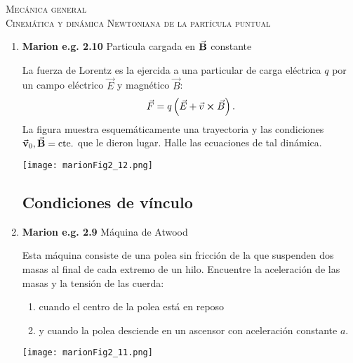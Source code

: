 \documentclass[11pt,spanish,a4paper]{article}
\begin{document}
\begin{center}
  \textsc{\large Mecánica general}\\
  \textsc{\large Cinemática y dinámica Newtoniana de la partícula puntual}
\end{center}

\begin{enumerate}


\subsection*{Ecuaciones de la dinámica - 2"a ley de Netwon}
\item
\begin{minipage}[t][6.5cm]{0.6\textwidth}
\textbf{Marion e.g. 2.10} Particula cargada en \(\va{B}\) constante

La fuerza de Lorentz es la ejercida a una particular de carga eléctrica \(q\) por un campo eléctrico \(\vec{E}\) y magnético \(\vec{B}\):
\[
	\vec{F}= q \left( \vec{E}+ \vec{v} \cross \vec{B} \right).
\]
La figura muestra esquemáticamente una trayectoria y las condiciones \(\va{v}_0, \va{B}=\mathrm{cte}.\) que le dieron lugar.
Halle las ecuaciones de tal dinámica.
\end{minipage}
\begin{minipage}[c][0cm][t]{0.35\textwidth}
	\texttt{[image: marionFig2\_12.png]}
\end{minipage}

\vspace{-2.5cm}



\subsection*{Condiciones de vínculo}
\vspace{-1cm}
\item
\begin{minipage}[t][4cm]{0.4\textwidth}
\textbf{Marion e.g. 2.9} Máquina de Atwood 

Esta máquina consiste de una polea sin fricción de la que suspenden dos masas al final de cada extremo de un hilo.
Encuentre la aceleración de las masas y la tensión de las cuerda:
  \begin{enumerate}
	\item cuando el centro de la polea está en reposo
	\item y cuando la polea desciende en un ascensor con aceleración constante \(a\).
  \end{enumerate}
\end{minipage}
\begin{minipage}[c][2cm][t]{0.55\textwidth}
	\texttt{[image: marionFig2\_11.png]}
\end{minipage}


\end{enumerate}
\end{document}

